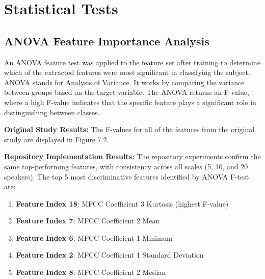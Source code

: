 \documentclass[11pt,twoside,openany]{book}
\begin{document}
\section{Statistical Tests}
\subsection{ANOVA Feature Importance Analysis}
An ANOVA feature test was applied to the feature set after training to determine which of the extracted features were most significant in classifying the subject. ANOVA stands for Analysis of Variance. It works by comparing the variance between groups based on the target variable. The ANOVA returns an F-value, where a high F-value indicates that the specific feature plays a significant role in distinguishing between classes.

\textbf{Original Study Results:} The F-values for all of the features from the original study are displayed in Figure 7.2.

\textbf{Repository Implementation Results:} The repository experiments confirm the same top-performing features, with consistency across all scales (5, 10, and 20 speakers). The top 5 most discriminative features identified by ANOVA F-test are:

\begin{enumerate}[itemsep=1pt]
\item \textbf{Feature Index 18}: MFCC Coefficient 3 Kurtosis (highest F-value)
\item \textbf{Feature Index 7}: MFCC Coefficient 2 Mean
\item \textbf{Feature Index 6}: MFCC Coefficient 1 Minimum
\item \textbf{Feature Index 2}: MFCC Coefficient 1 Standard Deviation
\item \textbf{Feature Index 8}: MFCC Coefficient 2 Median
\end{enumerate}
\end{document}
